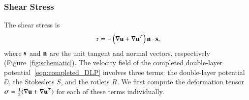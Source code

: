 \documentclass[preprint, 10pt]{elsarticle}
\begin{document}
\subsubsection{Shear Stress}
The shear stress is
\begin{align*}
  \tau = -\left(\nabla \uu + \nabla \uu^T \right)\nn \cdot \ss,
\end{align*}
where $\ss$ and $\nn$ are the unit tangent and normal vectors,
respectively (Figure~\ref{fig:schematic}).  The velocity field of the
completed double-layer potential~\eqref{eqn:completed_DLP} involves
three terms: the double-layer potential $\DD$, the Stokeslets $S$, and
the rotlets $R$.  We first compute the deformation tensor $\ssigma =
\frac{1}{2}(\nabla\uu + \nabla\uu^T)$ for each of these terms
individually.
\end{document}

